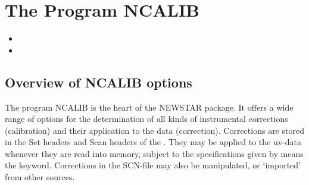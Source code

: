 %
%
\chapter{The Program NCALIB}

\begin{itemize}
\item {}
\item {}
\end{itemize}


\section{Overview of NCALIB options}
\label{.overview}

	The program NCALIB is the heart of the NEWSTAR package.  It offers a
wide range of options for the determination of all kinds of instrumental
corrections (calibration) and their application to the data (correction).
Corrections are stored in the Set headers and Scan headers of the .  They may be applied to the uv-data whenever they are read
into memory, subject to the specifications given by means the
 keyword. Corrections in the SCN-file may also be
manipulated, or `imported' from other sources.


